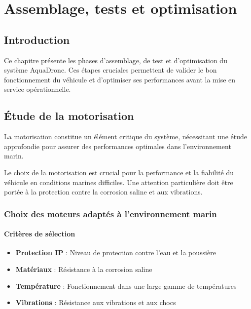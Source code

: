 \chapter[Assemblage, tests et optimisation]{Assemblage, tests et optimisation}
\label{cp:assemblage-tests}

{
\parindent0pt

\section{Introduction}
Ce chapitre présente les phases d'assemblage, de test et d'optimisation du système AquaDrone. Ces étapes cruciales permettent de valider le bon fonctionnement du véhicule et d'optimiser ses performances avant la mise en service opérationnelle.

\section{Étude de la motorisation}
La motorisation constitue un élément critique du système, nécessitant une étude approfondie pour assurer des performances optimales dans l'environnement marin.

\begin{block}[note]
Le choix de la motorisation est crucial pour la performance et la fiabilité du véhicule en conditions marines difficiles. Une attention particulière doit être portée à la protection contre la corrosion saline et aux vibrations.
\end{block}

\subsection{Choix des moteurs adaptés à l'environnement marin}
\subsubsection{Critères de sélection}
\begin{itemize}
    \item \textbf{Protection IP} : Niveau de protection contre l'eau et la poussière
    \item \textbf{Matériaux} : Résistance à la corrosion saline
    \item \textbf{Température} : Fonctionnement dans une large gamme de températures
    \item \textbf{Vibrations} : Résistance aux vibrations et aux chocs
\end{itemize}

}
